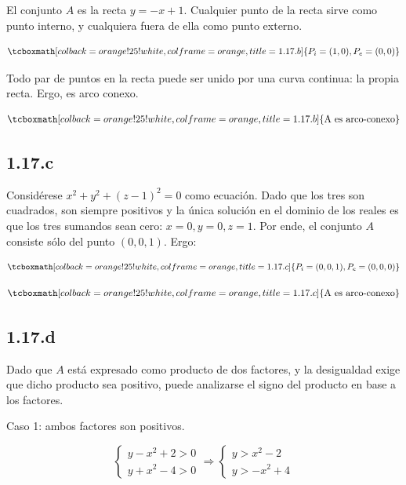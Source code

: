 \documentclass{article}
\begin{document}
El conjunto $A$ es la recta $y = -x + 1$. Cualquier punto de la recta sirve como punto interno, y cualquiera fuera de ella como punto externo.

\begin{equation}
\tcboxmath[colback=orange!25!white,colframe=orange,title=1.17.b]
{
P_i = (1, 0), P_e = (0, 0)
}
\end{equation}

Todo par de puntos en la recta puede ser unido por una curva continua: la propia recta. Ergo, es arco conexo.

\begin{equation}
\tcboxmath[colback=orange!25!white,colframe=orange,title=1.17.b]
{ \text{A es arco-conexo} }
\end{equation}

\subsection*{1.17.c}
\label{subsec:1.17.c}

Considérese $x^2 + y^2 + (z-1)^2 = 0$ como ecuación. Dado que los tres son cuadrados, son siempre positivos y la única solución en el dominio de los reales es que los tres sumandos sean cero: $x = 0, y = 0, z = 1$. Por ende, el conjunto $A$ consiste sólo del punto $(0, 0, 1)$. Ergo:

\begin{equation}
\tcboxmath[colback=orange!25!white,colframe=orange,title=1.17.c]
{
P_i = (0, 0, 1), P_e = (0, 0, 0)
}
\end{equation}

\begin{equation}
\tcboxmath[colback=orange!25!white,colframe=orange,title=1.17.c]
{ \text{A es arco-conexo} }
\end{equation}

\subsection*{1.17.d}
\label{subsec:1.17.d}

Dado que $A$ está expresado como producto de dos factores, y la desigualdad exige que dicho producto sea positivo, puede analizarse el signo del producto en base a los factores.

Caso 1: ambos factores son positivos.

\begin{equation}
\left\{ \begin{array}{ll}
y - x^2 + 2 > 0 \\
y + x^2 -4 > 0
\end{array}
\right. \Rightarrow \left\{ \begin{array}{ll}
y > x^2 - 2 \\
y > -x^2 + 4
\end{array}
\right.
\end{equation}
\end{document}
